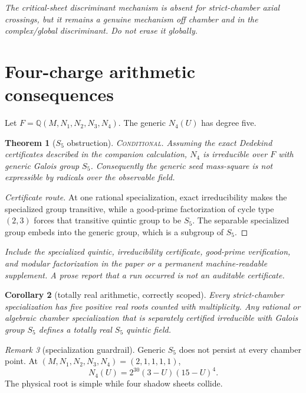 \documentclass[11pt]{article}
\newtheorem{theorem}{Theorem}[section]
\newtheorem{corollary}[theorem]{Corollary}
\theoremstyle{remark}
\newtheorem{remark}[theorem]{Remark}
\newcommand{\Q}{\mathbb Q}
\newcommand{\status}[1]{\textup{\textsc{#1}}}
\newcommand{\conditional}{\status{Conditional}}
\newcommand{\proofstop}[1]{\par\medskip\noindent{\color{red!75!black}\textbf{STOP--PROOF.}} \textit{#1}\par\medskip}
\begin{document}
\proofstop{The critical-sheet discriminant mechanism is absent for
strict-chamber axial crossings, but it remains a genuine mechanism off
chamber and in the complex/global discriminant. Do not erase it globally.}

\section{Four-charge arithmetic consequences}

Let $F=\Q(M,N_1,N_2,N_3,N_4)$. The generic $N_4(U)$ has degree five.

\begin{theorem}[$S_5$ obstruction]\label{thm:S5}
\conditional.
Assuming the exact Dedekind certificates described in the companion
calculation, $N_4$ is irreducible over $F$ with generic Galois group $S_5$.
Consequently the generic seed mass-square is not expressible by radicals
over the observable field.
\end{theorem}

\begin{proof}[Certificate route]
At one rational specialization, exact irreducibility makes the specialized
group transitive, while a good-prime factorization of cycle type $(2,3)$
forces that transitive quintic group to be $S_5$. The separable specialized
group embeds into the generic group, which is a subgroup of $S_5$.
\end{proof}

\proofstop{Include the specialized quintic, irreducibility certificate,
good-prime verification, and modular factorization in the paper or a
permanent machine-readable supplement. A prose report that a run occurred
is not an auditable certificate.}

\begin{corollary}[totally real arithmetic, correctly scoped]
Every strict-chamber specialization has five positive real roots counted
with multiplicity. Any rational or algebraic chamber specialization that is
separately certified irreducible with Galois group $S_5$ defines a totally
real $S_5$ quintic field.
\end{corollary}

\begin{remark}[specialization guardrail]
Generic $S_5$ does not persist at every chamber point. At
$(M,N_1,N_2,N_3,N_4)=(2,1,1,1,1)$,
\[
N_4(U)=2^{30}(3-U)(15-U)^4.
\]
The physical root is simple while four shadow sheets collide.
\end{remark}
\end{document}
